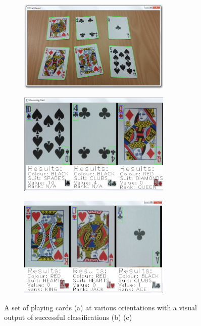 \documentclass[a4paper,12pt,notitlepage]{article}
\begin{document}
		\begin{figure}[H]
			\centering
			\begin{subfigure}[b]{\textwidth}
				\centering
				\includegraphics[width=0.8\textwidth]{chris/image1}
				\caption{}
			\end{subfigure}
		\end{figure}
		\begin{figure}[H]
			\ContinuedFloat
			\centering
			\begin{subfigure}[b]{\textwidth}
				\centering
				\includegraphics[width=0.8\textwidth]{chris/image2}
				\caption{}
			\end{subfigure}
		\end{figure}
		\begin{figure}[H]
			\ContinuedFloat
			\centering
			\begin{subfigure}[b]{\textwidth}
				\centering
				\includegraphics[width=0.8\textwidth]{chris/image3}
				\caption{}
			\end{subfigure}
			\caption{A set of playing cards (a) at various orientations with a visual output of successful classifications (b) (c)}
			\label{fig:success}
		\end{figure}
\end{document}

